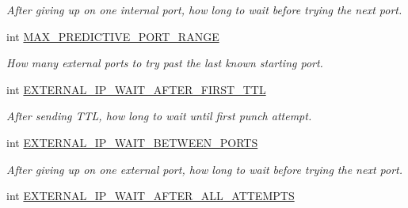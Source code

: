 \begin{DoxyCompactItemize}
\begin{DoxyCompactList}\small\item\em After giving up on one internal port, how long to wait before trying the next port. \end{DoxyCompactList}\item 
\hypertarget{struct_rak_net_1_1_punchthrough_configuration_a3a76b7b0b8415702c19e22efc510c070}{int \hyperlink{struct_rak_net_1_1_punchthrough_configuration_a3a76b7b0b8415702c19e22efc510c070}{M\-A\-X\-\_\-\-P\-R\-E\-D\-I\-C\-T\-I\-V\-E\-\_\-\-P\-O\-R\-T\-\_\-\-R\-A\-N\-G\-E}}\label{struct_rak_net_1_1_punchthrough_configuration_a3a76b7b0b8415702c19e22efc510c070}

\begin{DoxyCompactList}\small\item\em How many external ports to try past the last known starting port. \end{DoxyCompactList}\item 
\hypertarget{struct_rak_net_1_1_punchthrough_configuration_a2c4f55aa42483ba6d86cea5d278e3428}{int \hyperlink{struct_rak_net_1_1_punchthrough_configuration_a2c4f55aa42483ba6d86cea5d278e3428}{E\-X\-T\-E\-R\-N\-A\-L\-\_\-\-I\-P\-\_\-\-W\-A\-I\-T\-\_\-\-A\-F\-T\-E\-R\-\_\-\-F\-I\-R\-S\-T\-\_\-\-T\-T\-L}}\label{struct_rak_net_1_1_punchthrough_configuration_a2c4f55aa42483ba6d86cea5d278e3428}

\begin{DoxyCompactList}\small\item\em After sending T\-T\-L, how long to wait until first punch attempt. \end{DoxyCompactList}\item 
\hypertarget{struct_rak_net_1_1_punchthrough_configuration_aa27ad44ed00304b5a3c601f76541d00f}{int \hyperlink{struct_rak_net_1_1_punchthrough_configuration_aa27ad44ed00304b5a3c601f76541d00f}{E\-X\-T\-E\-R\-N\-A\-L\-\_\-\-I\-P\-\_\-\-W\-A\-I\-T\-\_\-\-B\-E\-T\-W\-E\-E\-N\-\_\-\-P\-O\-R\-T\-S}}\label{struct_rak_net_1_1_punchthrough_configuration_aa27ad44ed00304b5a3c601f76541d00f}

\begin{DoxyCompactList}\small\item\em After giving up on one external port, how long to wait before trying the next port. \end{DoxyCompactList}\item 
\hypertarget{struct_rak_net_1_1_punchthrough_configuration_ab7036c2753605698e2bfdccb9231c2ac}{int \hyperlink{struct_rak_net_1_1_punchthrough_configuration_ab7036c2753605698e2bfdccb9231c2ac}{E\-X\-T\-E\-R\-N\-A\-L\-\_\-\-I\-P\-\_\-\-W\-A\-I\-T\-\_\-\-A\-F\-T\-E\-R\-\_\-\-A\-L\-L\-\_\-\-A\-T\-T\-E\-M\-P\-T\-S}}\label{struct_rak_net_1_1_punchthrough_configuration_ab7036c2753605698e2bfdccb9231c2ac}


\end{DoxyCompactItemize}
